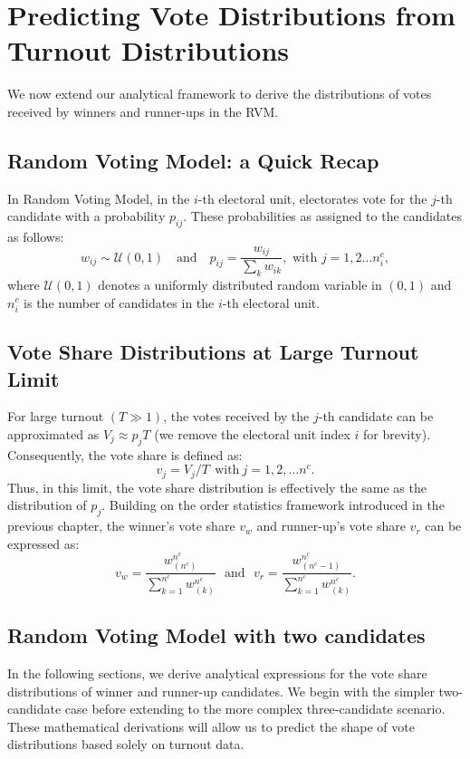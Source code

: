 \section{Predicting Vote Distributions from Turnout Distributions}
We now extend our analytical framework to derive the distributions of votes received by winners and runner-ups in the RVM.

\subsection{Random Voting Model: a Quick Recap}
In Random Voting Model, in the $i$-th electoral unit, electorates vote for the $j$-th candidate with a probability $p_{ij}$. These probabilities as assigned to the candidates as follows:
\begin{equation}
    w_{ij} \sim \mathcal{U}(0, 1) \quad \text{and} \quad p_{ij} = \frac{w_{ij}}{\sum_k w_{ik}}, \text{ with } j = 1, 2 \dots n^c_i,
    \label{eq:RVM_prob}
\end{equation}
where $\mathcal{U}(0, 1)$ denotes a uniformly distributed random variable in $(0,1)$ and $n^c_i$ is the number of candidates in the $i$-th electoral unit.

\subsection{Vote Share Distributions at Large Turnout Limit}
For large turnout $(T \gg 1)$, the votes received by the $j$-th candidate can be approximated as $V_j \approx p_j T$ (we remove the electoral unit index $i$ for brevity). Consequently, the vote share is defined as:
\begin{equation}
    v_j = V_j/T ~~ \text{with} ~ j = 1, 2, \dots n^c.
    \label{eq:voteshare}
\end{equation}
Thus, in this limit, the vote share distribution is effectively the same as the distribution of $p_j$. Building on the order statistics framework introduced in the previous chapter, the winner's vote share $v_w$ and runner-up's vote share $v_r$ can be expressed as:
\begin{equation}
    v_w = \frac{w^{n^c}_{(n^c)}}{\sum_{k = 1}^{n^c}w^{n^c}_{(k)}} ~~~\text{and}~~~ v_r = \frac{w^{n^c}_{(n^c - 1)}}{\sum_{k = 1}^{n^c}w^{n^c}_{(k)}}.
    \label{eq:voteshare_order_stat}
\end{equation}

\subsection{Random Voting Model with two candidates}
In the following sections, we derive analytical expressions for the vote share distributions of winner and runner-up candidates. We begin with the simpler two-candidate case before extending to the more complex three-candidate scenario. These mathematical derivations will allow us to predict the shape of vote distributions based solely on turnout data.

